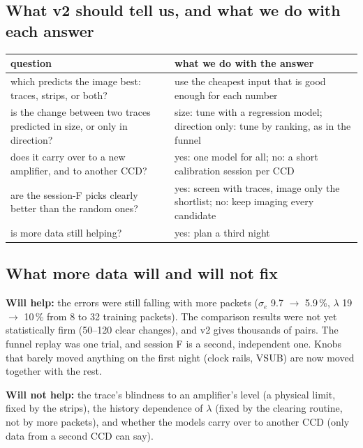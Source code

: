 \documentclass[11pt]{article}
\begin{document}
\subsection{What v2 should tell us, and what we do with each answer}
\begin{center}\small
\begin{tabular}{p{7.4cm}p{7.8cm}}\toprule
question & what we do with the answer\\\midrule
which predicts the image best: traces, strips, or both? & use the cheapest input that is good enough for each number\\
is the change between two traces predicted in size, or only in direction? & size: tune with a regression model; direction only: tune by ranking, as in the funnel\\
does it carry over to a new amplifier, and to another CCD? & yes: one model for all; no: a short calibration session per CCD\\
are the session-F picks clearly better than the random ones? & yes: screen with traces, image only the shortlist; no: keep imaging every candidate\\
is more data still helping? & yes: plan a third night\\\bottomrule
\end{tabular}
\end{center}

\subsection{What more data will and will not fix}
\textbf{Will help:} the errors were still falling with more packets ($\sigma_e$ 9.7 $\to$ 5.9\,\%, $\lambda$ 19 $\to$
10\,\% from 8 to 32 training packets). The comparison results were not yet statistically firm (50--120 clear changes),
and v2 gives thousands of pairs. The funnel replay was one trial, and session F is a second, independent one. Knobs
that barely moved anything on the first night (clock rails, VSUB) are now moved together with the rest.

\textbf{Will not help:} the trace's blindness to an amplifier's level (a physical limit, fixed by the strips), the
history dependence of $\lambda$ (fixed by the clearing routine, not by more packets), and whether the models carry
over to another CCD (only data from a second CCD can say).

\end{document}
